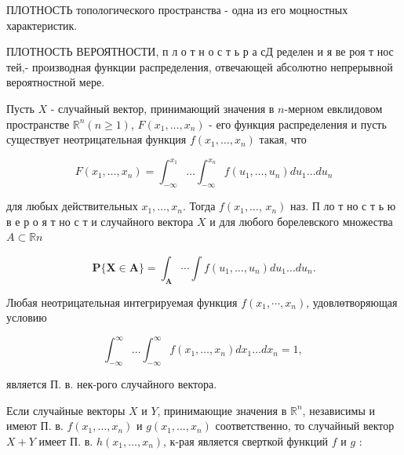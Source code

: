 \documentclass[10pt]{article}
\begin{document}
ПЛОТНОСТЬ топологического пространства - одна из его моцностных характеристик.



ПЛОТНОСТЬ ВЕРОЯТНОСТИ, п л о т н о с т ь р а сД ределен и я ве роя т нос тей,- производная функции распределения, отвечающей абсолютно непрерывной вероятностной мере.



Пусть $X$ - случайный вектор, принимающий значения в $n$-мерном евклидовом пространстве $\mathbb{R}^{n}(n \geqslant 1)$, $F\left(x_{1}, \ldots, x_{n}\right)$ - его функция распределения и пусть существует неотрицательная функция $f\left(x_{1}, \ldots, x_{n}\right)$ такая, что



\[

F\left(x_{1}, \ldots, x_{n}\right)=\int_{-\infty}^{x_{1}} \ldots \int_{-\infty}^{x_{n}} f\left(u_{1}, \ldots, u_{n}\right) d u_{1} \ldots d u_{n}

\]



для любых действительных $x_{1}, \ldots, x_{n}$. Тогда $f\left(x_{1}, \ldots\right.$, $\left.x_{n}\right)$ наз. П ло т но с т ь ю в е р о я т но с т и случайного вектора $X$ и для любого борелевского множества $A \subset \mathbb{R} n$



\[

\mathbf{P}\{\boldsymbol{X} \in \boldsymbol{A}\}=\int_{\boldsymbol{A}} \cdots \int f\left(u_{1}, \ldots, u_{n}\right) d u_{1} \ldots d u_{n} .

\]



Любая неотрицательная интегрируемая функция $f\left(x_{1}, \cdots, x_{n}\right)$, удовлөтворяющая условию



\[

\int_{-\infty}^{\infty} \ldots \int_{-\infty}^{\infty} f\left(x_{1}, \ldots, x_{n}\right) d x_{1} \ldots d x_{n}=1 \text {, }

\]



является П. в. нек-рого случайного вектора.



Если случайные векторы $X$ и $Y$, принимающие значения в $\mathbb{R}^{n}$, независимы и имеют П. в. $f\left(x_{1}, \ldots, x_{n}\right)$ и $g\left(x_{1}, \ldots, x_{n}\right)$ соответственно, то случайный вектор $X+Y$ имеет П. в. $h\left(x_{1}, \ldots, x_{n}\right)$, к-рая является сверткой функций $f$ и $g$ :
\end{document}
